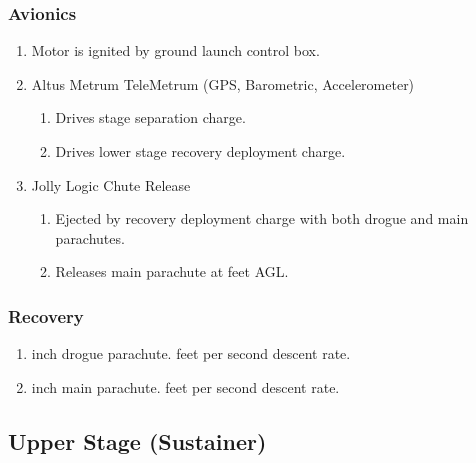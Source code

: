 \documentclass[12pt]{article}
\newcommand{\ph}{\framebox[48pt]{\rule{0pt}{12pt}}}
\begin{document}
\subsubsection{Avionics}
\begin{enumerate}[label=(\alph*)]
    \item Motor is ignited by ground launch control box.
    \item Altus Metrum TeleMetrum (GPS, Barometric, Accelerometer)
    \begin{enumerate}[label=(\arabic*)]
        \item Drives stage separation charge.
        \item Drives lower stage recovery deployment charge.
    \end{enumerate}
    \item Jolly Logic Chute Release
    \begin{enumerate}[label=(\arabic*)]
        \item Ejected by recovery deployment charge with both drogue and main parachutes.
        \item Releases main parachute at \ph feet AGL.
    \end{enumerate}
\end{enumerate}
\subsubsection{Recovery}
\begin{enumerate}[label=(\alph*)]
    \item \ph inch drogue parachute. \ph feet per second descent rate.
    \item \ph inch main parachute. \ph feet per second descent rate.
\end{enumerate}
\subsection{Upper Stage (Sustainer)}
\end{document}
